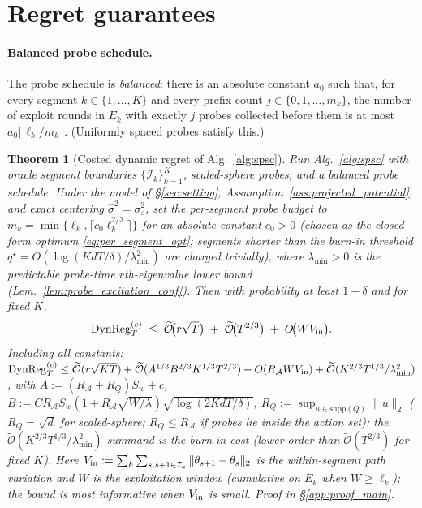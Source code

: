\documentclass{article}
\newcommand{\cA}{\mathcal{A}}
\newcommand{\cI}{\mathcal{I}}
\newcommand{\tilO}{\widetilde{\mathcal{O}}}
\newcommand{\DynReg}{\mathrm{DynReg}}
\newtheorem{theorem}{Theorem}[section]
\begin{document}
\section{Regret guarantees}
\label{sec:theory}

\paragraph{Balanced probe schedule.} The probe schedule is
\emph{balanced}: there is an absolute constant $a_0$ such that, for
every segment $k\in\{1,\dots,K\}$ and every prefix-count
$j\in\{0,1,\dots,m_k\}$, the number of exploit rounds in $E_k$ with
exactly $j$ probes collected before them is at most
$a_0\lceil\ell_k/m_k\rceil$. (Uniformly spaced probes satisfy this.)

\begin{theorem}[Costed dynamic regret of Alg.~\ref{alg:spsc}]
\label{thm:spsc_regret}
Run Alg.~\ref{alg:spsc} with oracle segment boundaries
$\{\cI_k\}_{k=1}^K$, scaled-sphere probes, and a balanced probe
schedule. Under the model of \S\ref{sec:setting},
Assumption~\ref{ass:projected_potential}, and exact centering
$\widehat\sigma^2=\sigma_\varepsilon^2$, set the per-segment probe
budget to $m_k=\min\{\ell_k,\lceil c_0\ell_k^{2/3}\rceil\}$ for an
absolute constant $c_0>0$ (chosen as the closed-form optimum
\eqref{eq:per_segment_opt}; segments shorter than the burn-in
threshold $q^\star=O(\log(KdT/\delta)/\lambda_{\min}^2)$ are charged
trivially), where $\lambda_{\min}>0$ is the predictable probe-time
$r$th-eigenvalue lower bound (Lem.~\ref{lem:probe_excitation_conf}).
Then with probability at least $1-\delta$ and for fixed $K$,
\begin{equation}
\DynReg_T^{(c)} \;\le\; \tilO\!\bigl(r\sqrt{T}\bigr) \;+\; \tilO\!\bigl(T^{2/3}\bigr) \;+\; O\!\bigl(W V_{\rm in}\bigr).
\label{eq:main_bound}
\end{equation}
Including all constants:
$\DynReg_T^{(c)} \le \tilO(r\sqrt{KT}) + \tilO(A^{1/3}B^{2/3}K^{1/3}T^{2/3}) + O(R_\cA W V_{\rm in}) + \tilO(K^{2/3}T^{1/3}/\lambda_{\min}^2)$,
with $A:=(R_\cA+R_Q)S_w+c$,
$B:=C R_\cA S_w(1+R_\cA\sqrt{W/\lambda})\sqrt{\log(2KdT/\delta)}$,
$R_Q:=\sup_{u\in\mathrm{supp}(Q)}\|u\|_2$ ($R_Q=\sqrt d$ for
scaled-sphere; $R_Q\le R_\cA$ if probes lie inside the action set);
the $\tilO(K^{2/3}T^{1/3}/\lambda_{\min}^2)$ summand is the burn-in
cost (lower order than $\tilO(T^{2/3})$ for fixed $K$). Here
$V_{\rm in}:=\sum_k\sum_{s,s+1\in\cI_k}\|\theta_{s+1}-\theta_s\|_2$
is the within-segment path variation and $W$ is the exploitation
window (cumulative on $E_k$ when $W\ge\ell_k$); the bound is most
informative when $V_{\rm in}$ is small. Proof in
\S\ref{app:proof_main}.
\end{theorem}
\end{document}
